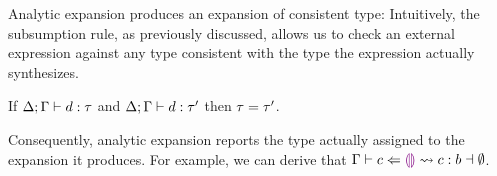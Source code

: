 %
Analytic expansion produces an expansion of consistent type:
%
Intuitively, the subsumption rule, as previously discussed, allows us
to check an external expression against any type consistent with the
type the expression actually synthesizes.


\begin{thm}
  If $\Delta; \Gamma \vdash d : \tau$
  and $\Delta; \Gamma \vdash d : \tau'$
  then $\tau=\tau'$.
\end{thm}
\noindent
Consequently, analytic expansion reports the type actually assigned to the expansion it produces.
%
For example, we can derive that $\Gamma \vdash c \Leftarrow \textcolor{violet}{\llparenthesis}\textcolor{violet}{\rrparenthesis} \leadsto c : b \dashv \emptyset$.%

